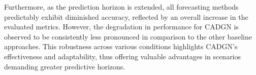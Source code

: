 \documentclass[lettersize,journal]{IEEEtran}
\begin{document}

Furthermore, as the prediction horizon is extended, all forecasting methods predictably exhibit diminished accuracy, reflected by an overall increase in the evaluated metrics. However,  the degradation in performance for CADGN is observed to be consistently less pronounced in comparison to the other baseline approaches. This robustness across various conditions highlights CADGN's effectiveness and adaptability, thus offering valuable advantages in scenarios demanding greater predictive horizons.
 
\end{document}

